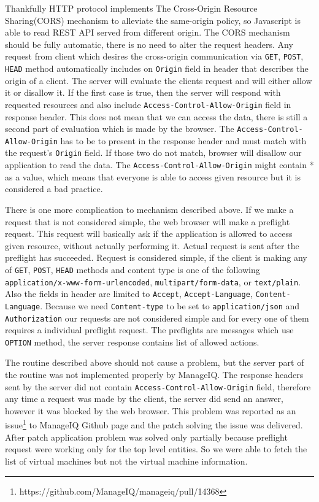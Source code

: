 Thankfully HTTP protocol implements The Cross-Origin Resource Sharing(CORS)\cite{cors} mechanism to alleviate the same-origin policy, so Javascript is able to read REST API served from different origin. The CORS mechanism should be fully automatic, there is no need to alter the request headers. Any request from client which desires the cross-origin communication via \texttt{GET}, \texttt{POST}, \texttt{HEAD} method automatically includes on \texttt{Origin} field in header that describes the origin of a client. The server will evaluate the clients request and will either allow it or disallow it. If the first case is true, then the server will respond with requested resources and also include \texttt{Access-Control-Allow-Origin} field in response header. This does not mean that we can access the data, there is still a second part of evaluation which is made by the browser. The \texttt{Access-Control-Allow-Origin} has to be to present in the response header and must match with the request's \texttt{Origin} field. If those two do not match, browser will disallow our application to read the data. The \texttt{Access-Control-Allow-Origin} might contain * as a value, which means that everyone is able to access given resource but it is considered a bad practice.

There is one more complication to mechanism described above. If we make a request that is not considered simple, the web browser will make a preflight request. This request will basically ask if the application is allowed to access given resource, without actually performing it. Actual request is sent after the preflight has succeeded. Request is considered simple, if the client is making any of \texttt{GET}, \texttt{POST}, \texttt{HEAD} methods and content type is one of the following \texttt{application/x-www-form-urlencoded}, \texttt{multipart/form-data}, or \texttt{text/plain}. Also the fields in header are limited to \texttt{Accept}, \texttt{Accept-Language}, \texttt{Content-Language}. Because we need \texttt{Content-type} to be set to \texttt{application/json} and \texttt{Authorization} our requests are not considered simple and for every one of them requires a individual preflight request. The preflights are messages which use \texttt{OPTION} method, the server response contains list of allowed actions.

The routine described above should not cause a problem, but the server part of the routine was not implemented properly by ManageIQ. The response headers sent by the server did not contain \texttt{Access-Control-Allow-Origin} field, therefore any time a request was made by the client, the server did send an answer, however it was blocked by the web browser. This problem was reported as an issue\footnote{https://github.com/ManageIQ/manageiq/pull/14368} to ManageIQ Github page and the patch solving the issue was delivered. After patch application problem was solved only partially because preflight request were working only for the top level entities. So we were able to fetch the list of virtual machines but not the virtual machine information.


